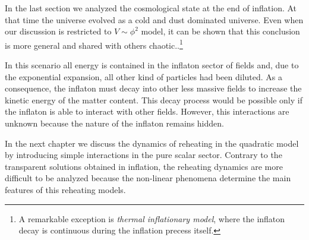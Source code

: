 \documentclass[12pt,letterpaper,twoside]{book}
\begin{document}
In the last section we analyzed  the cosmological state at the end of inflation.
At that time the universe evolved as a cold and dust dominated universe. Even when
our discussion is restricted to $V\sim\phi^2$ model, it can be shown that this
conclusion is more general and shared with others chaotic..\footnote{A
    remarkable exception is \textit{thermal inflationary model}, where the
    inflaton decay is continuous during the inflation precess itself.}

In this scenario all energy is contained in the inflaton sector of fields
and, due to the exponential expansion, all other kind of particles had been
diluted. As a consequence, the inflaton must decay into other less massive fields
to increase the kinetic energy of the matter content. This  decay
process would be possible only if the inflaton is able to interact with other fields.
However, this interactions are unknown because the nature of the inflaton remains
hidden. 

In the next chapter we discuss the dynamics of reheating in the quadratic model
by  introducing simple interactions in the pure scalar sector. Contrary to the
transparent solutions obtained in inflation, the reheating dynamics are more
difficult to be analyzed because the non-linear phenomena determine the main
features of this reheating models.





\end{document}
